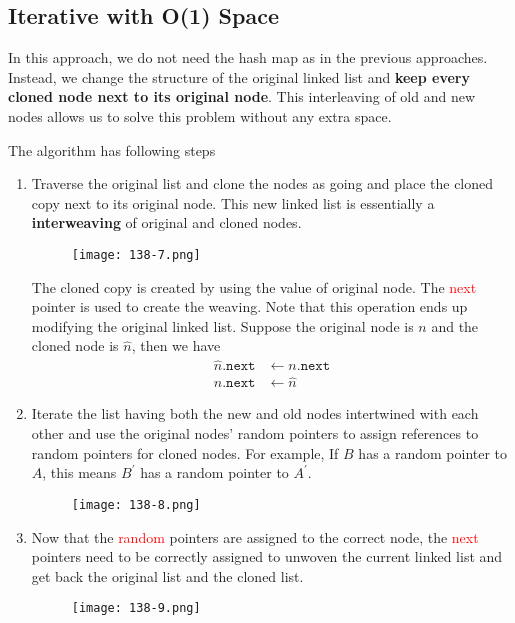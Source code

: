 \subsection{Iterative with O(1) Space}
In this approach, we do not need the hash map as in the previous approaches. Instead, we change the structure of the original linked list and \textbf{keep every cloned node next to its original node}. This interleaving of old and new nodes allows us to solve this problem without any extra space. 
\par
The algorithm has following steps
\begin{enumerate}
    \item Traverse the original list and clone the nodes as going and place the cloned copy next to its original node. This new linked list is essentially a \textbf{interweaving} of original and cloned nodes.
        \begin{figure}[H]
        \centering
        \texttt{[image: 138-7.png]}
        \end{figure}  
    The cloned copy is created by using the value of original node. The \textcolor{red}{next} pointer is used to create the weaving. Note that this operation ends up modifying the original linked list. Suppose the original node is $n$ and the cloned node is $\hat{n}$, then we have
    \begin{align*}
        \hat{n}.\texttt{next} & \gets n.\texttt{next}\\
        n.\texttt{next} &\gets \hat{n}
    \end{align*}
    \item Iterate the list having both the new and old nodes intertwined with each other and use the original nodes' random pointers to assign references to random pointers for cloned nodes. For example, If $B$ has a random pointer to $A$, this means $B^{'}$ has a random pointer to $A^{'}$.
        \begin{figure}[H]
        \centering
        \texttt{[image: 138-8.png]}
        \end{figure}
    \item Now that the \textcolor{red}{random} pointers are assigned to the correct node, the \textcolor{red}{next} pointers need to be correctly assigned to unwoven the current linked list and get back the original list and the cloned list.
        \begin{figure}[H]
        \centering
        \texttt{[image: 138-9.png]}
        \end{figure}    
\end{enumerate}